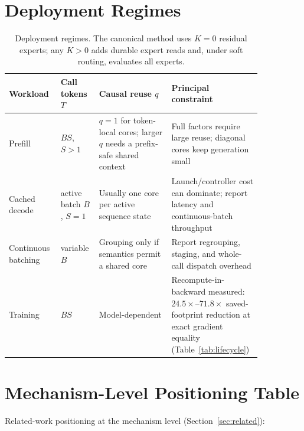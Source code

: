 \section{Deployment Regimes}
\label{app:regimes}

\begin{table}[h]
\centering
\caption{Deployment regimes.  The canonical method uses $K=0$ residual
experts; any $K>0$ adds durable expert reads and, under soft routing, evaluates
all experts.}
\label{tab:regimes}
\begin{tabular}{>{\raggedright\arraybackslash}p{0.17\linewidth}>{\raggedright\arraybackslash}p{0.13\linewidth}>{\raggedright\arraybackslash}p{0.27\linewidth}>{\raggedright\arraybackslash}p{0.28\linewidth}}
\toprule
Workload & Call tokens $T$ & Causal reuse $q$ & Principal constraint \\
\midrule
Prefill & $BS$, $S>1$ & $q=1$ for token-local cores; larger $q$ needs a prefix-safe shared context & Full factors require large reuse; diagonal cores keep generation small \\
Cached decode & active batch $B$, $S=1$ & Usually one core per active sequence state & Launch/controller cost can dominate; report latency and continuous-batch throughput \\
Continuous batching & variable $B$ & Grouping only if semantics permit a shared core & Report regrouping, staging, and whole-call dispatch overhead \\
Training & $BS$ & Model-dependent & Recompute-in-backward measured: $24.5\times$--$71.8\times$ saved-footprint reduction at exact gradient equality (Table~\ref{tab:lifecycle}) \\
\bottomrule
\end{tabular}
\end{table}

\section{Mechanism-Level Positioning Table}
\label{app:positioning}

Related-work positioning at the mechanism level (Section~\ref{sec:related}):

